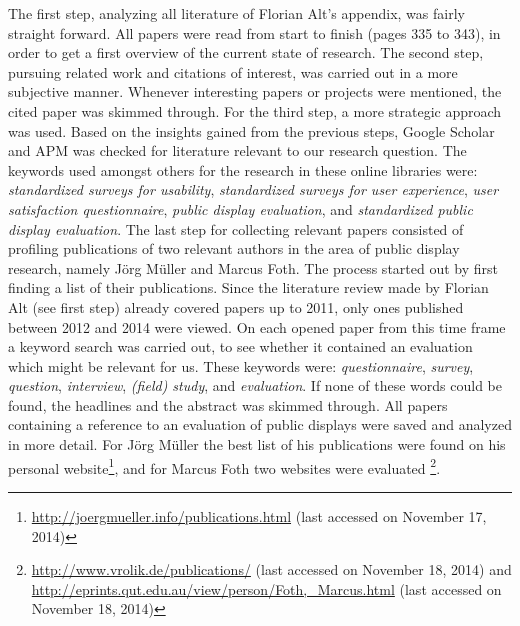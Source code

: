 	The first step, analyzing all literature of Florian Alt's appendix, was fairly straight forward. All papers were read from start to finish (pages 335 to 343), in order to get a first overview of the current state of research. 
	The second step, pursuing related work and citations of interest, was carried out in a more subjective manner. Whenever interesting papers or projects were mentioned, the cited paper was skimmed through. 
	For the third step, a more strategic approach was used. Based on the insights gained from the previous steps, Google Scholar and APM was checked for literature relevant to our research question. The keywords used amongst others for the research in these online libraries were: \textit{standardized surveys for usability}, \textit{standardized surveys for user experience}, \textit{user satisfaction questionnaire}, \textit{public display evaluation}, and \textit{standardized public display evaluation}.
	The last step for collecting relevant papers consisted of profiling publications of two relevant authors in the area of public display research, namely J\"org M\"uller and Marcus Foth. The process started out by first finding a list of their publications. Since the literature review made by Florian Alt (see first step) already covered papers up to 2011, only ones published between 2012 and 2014 were viewed. 
	On each opened paper from this time frame a keyword search was carried out, to see whether it contained an evaluation which might be relevant for us. These keywords were: \textit{questionnaire}, \textit{survey}, \textit{question}, \textit{interview}, \textit{(field) study}, and \textit{evaluation}. If none of these words could be found, the headlines and the abstract was skimmed through. All papers containing a reference to an evaluation of public displays were saved and analyzed in more detail.
	For J\"org M\"uller the best list of his publications were found on his personal website\footnote{\url{http://joergmueller.info/publications.html} (last accessed on November 17, 2014)}, and for Marcus Foth two websites were evaluated \footnote{\url{http://www.vrolik.de/publications/} (last accessed on November 18, 2014) and \url{http://eprints.qut.edu.au/view/person/Foth,_Marcus.html} (last accessed on November 18, 2014)}. 







